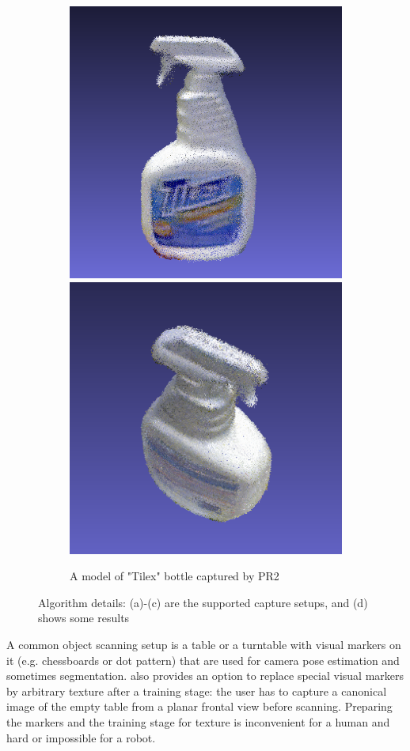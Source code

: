 \documentclass[letterpaper, 10 pt, conference]{ieeeconf}  %
\begin{document}
\begin{figure}[t]
        \begin{subfigure}[b]{\linewidth}
                \centering
                \includegraphics[width=0.49\linewidth]{../tizer/tilexFrontal.png}
                \includegraphics[width=0.49\linewidth]{../tizer/tilexTop.png}
                \caption{A model of "Tilex" bottle captured by PR2}
        \end{subfigure}
        \caption{Algorithm details: (a)-(c) are the supported 
        capture setups, and (d) shows some results}
        \label{fig:tizer}
\end{figure}


A common object scanning setup is a table or a turntable with
visual markers on it (e.g. chessboards or dot pattern) that
are used for camera pose estimation and sometimes segmentation.
\cite{ectoObjectRecognitionCapture} also 
provides an option to replace special visual markers by arbitrary texture
after a training stage:
the user has to capture a canonical image of the empty table from
a planar frontal view before scanning. Preparing the markers
and the training stage for texture is inconvenient for a human and
hard or impossible for a robot. 
\end{document}
